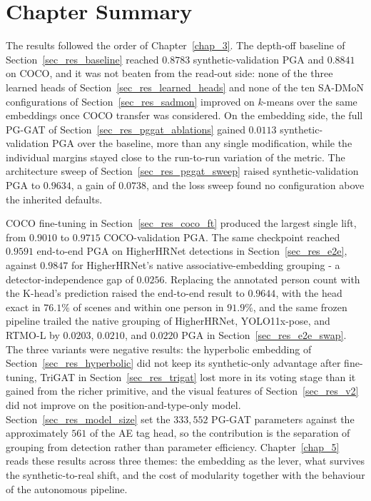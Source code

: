 \section{Chapter Summary}
\label{sec_res_summary}

The results followed the order of Chapter~\ref{chap_3}.
The depth-off baseline of Section~\ref{sec_res_baseline} reached $0.8783$ synthetic-validation PGA and $0.8841$ on COCO,
and it was not beaten from the read-out side:
none of the three learned heads of Section~\ref{sec_res_learned_heads}
and none of the ten SA-DMoN configurations of Section~\ref{sec_res_sadmon}
improved on $k$-means over the same embeddings once COCO transfer was considered.
On the embedding side,
the full PG-GAT of Section~\ref{sec_res_pggat_ablations} gained $0.0113$ synthetic-validation PGA over the baseline,
more than any single modification,
while the individual margins stayed close to the run-to-run variation of the metric.
The architecture sweep of Section~\ref{sec_res_pggat_sweep} raised synthetic-validation PGA to $0.9634$,
a gain of $0.0738$,
and the loss sweep found no configuration above the inherited defaults.

COCO fine-tuning in Section~\ref{sec_res_coco_ft} produced the largest single lift,
from $0.9010$ to $0.9715$ COCO-validation PGA.
The same checkpoint reached $0.9591$ end-to-end PGA on HigherHRNet detections in Section~\ref{sec_res_e2e},
against $0.9847$ for HigherHRNet's native associative-embedding grouping -
a detector-independence gap of $0.0256$.
Replacing the annotated person count with the K-head's prediction raised the end-to-end result to $0.9644$,
with the head exact in $76.1\%$ of scenes and within one person in $91.9\%$,
and the same frozen pipeline trailed the native grouping of HigherHRNet, YOLO11x-pose, and RTMO-L
by $0.0203$, $0.0210$, and $0.0220$ PGA in Section~\ref{sec_res_e2e_swap}.
The three variants were negative results:
the hyperbolic embedding of Section~\ref{sec_res_hyperbolic}
did not keep its synthetic-only advantage after fine-tuning,
TriGAT in Section~\ref{sec_res_trigat} lost more in its voting stage than it gained from the richer primitive,
and the visual features of Section~\ref{sec_res_v2} did not improve on the position-and-type-only model.
Section~\ref{sec_res_model_size} set the $333{,}552$ PG-GAT parameters
against the approximately $561$ of the AE tag head,
so the contribution is the separation of grouping from detection rather than parameter efficiency.
Chapter~\ref{chap_5} reads these results across three themes:
the embedding as the lever,
what survives the synthetic-to-real shift,
and the cost of modularity together with the behaviour of the autonomous pipeline.
